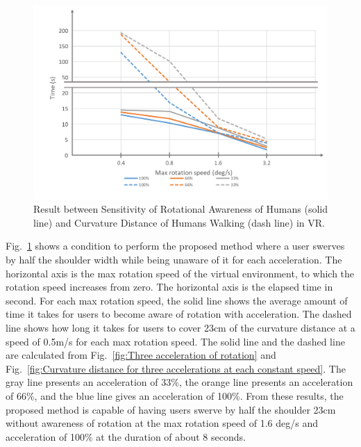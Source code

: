 \newpage
\begin{figure}[H]\centering
	\includegraphics[width=1.0\textwidth]{Pictures/CurvatureDistanceandTimes.png}%
	\caption{Result between Sensitivity of Rotational Awareness of Humans (solid line) and Curvature Distance of Humans Walking (dash line) in VR.}\label{fig:Exp2_ConcludeOfacceration}%
\end{figure}

Fig.~\ref{fig:Exp2_ConcludeOfacceration} shows a condition to perform the proposed method where a user swerves by half the shoulder width while being unaware of it for each acceleration. The horizontal axis is the max rotation speed of the virtual environment, to which the rotation speed increases from zero. The horizontal axis is the elapsed time in second. For each max rotation speed, the solid line shows the average amount of time it takes for users to become aware of rotation with acceleration. The dashed line shows how long it takes for users to cover 23cm of the curvature distance at a speed of 0.5m/s for each max rotation speed. The solid line and the dashed line are calculated from Fig.~\ref{fig:Three acceleration of rotation} and Fig.~\ref{fig:Curvature distance for three accelerations at each constant speed}. The gray line presents an acceleration of 33\%, the orange line presents an acceleration of 66\%, and the blue line gives an acceleration of 100\%. From these results, the proposed method is capable of having users swerve by half the shoulder 23cm without awareness of rotation at the max rotation speed of 1.6 deg/s and acceleration of 100\% at the duration of about 8 seconds.


